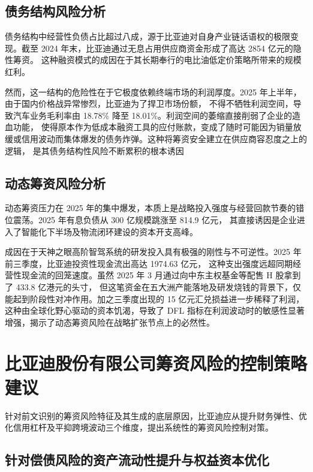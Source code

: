 \documentclass[12pt,a4paper,fontset=windows,UTF8]{ctexart}
\begin{document}
\subsection{债务结构风险分析}

债务结构中经营性负债占比超过八成，源于比亚迪对自身产业链话语权的极限变现。截至 2024 年末，比亚迪通过无息占用供应商资金形成了高达 2854 亿元的隐性筹资。
  这种融资模式的成因在于其长期奉行的电比油低定价策略所带来的规模红利。

然而，这一结构的危险性在于它极度依赖终端市场的利润厚度。2025 年上半年，由于国内价格战异常惨烈，比亚迪为了捍卫市场份额，
  不得不牺牲利润空间，导致汽车业务毛利率由 18.78\% 降至 18.01\%。利润空间的萎缩直接削弱了企业的造血功能，
  使得原本作为低成本融资工具的应付账款，变成了随时可能因为销量放缓或信用波动而集体爆发的债务炸弹。这种将筹资安全建立在供应商容忍度之上的逻辑，
  是其债务结构性风险不断累积的根本诱因

\subsection{动态筹资风险分析}

动态筹资压力在 2025 年的集中爆发，本质上是战略投入强度与经营回款节奏的错位震荡。2025 年有息负债从 300 亿规模跳涨至 814.9 亿元，
  其直接诱因是企业进入了智能化下半场及物流闭环建设的资本开支高峰。

成因在于天神之眼高阶智驾系统的研发投入具有极强的刚性与不可逆性。2025 年前三季度，比亚迪投资性现金流出高达 1974.63 亿元，
  这种支出强度远超同期经营性现金流的回笼速度。虽然 2025 年 3 月通过向中东主权基金等配售 H 股拿到了 433.8 亿港元的头寸，
  但这笔资金在五大洲产能落地及研发烧钱的背景下，仅能起到阶段性对冲作用。加之三季度出现的 15 亿元汇兑损益进一步稀释了利润，
  这种由全球化野心驱动的资本饥渴，导致了 DFL 指标在利润波动时的敏感性显著增强，揭示了动态筹资风险在战略扩张节点上的必然性。

\section{比亚迪股份有限公司筹资风险的控制策略建议}

针对前文识别的筹资风险特征及其生成的底层原因，比亚迪应从提升财务弹性、优化信用杠杆及平抑跨境波动三个维度，提出系统性的筹资风险控制对策。

\subsection{针对偿债风险的资产流动性提升与权益资本优化}
\end{document}
